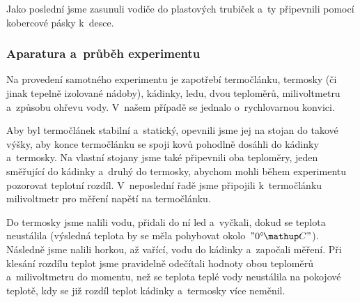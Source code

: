 Jako poslední jsme zasunuli vodiče do plastových trubiček a~ty připevnili
pomocí kobercové pásky k~desce.

\subsubsection{Aparatura a~průběh experimentu}
Na provedení samotného experimentu je zapotřebí termočlánku, termosky (či jinak
tepelně izolované nádoby), kádinky, ledu, dvou teploměrů, milivoltmetru
a~způsobu ohřevu vody. V~našem případě se jednalo o~rychlovarnou konvici.

Aby byl termočlánek stabilní a~statický, opevnili jsme jej na stojan do takové
výšky, aby konce termočlánku se spoji kovů pohodlně dosáhli do kádinky
a~termosky. Na vlastní stojany jsme také připevnili oba teploměry, jeden
směřující do kádinky a~druhý do termosky, abychom mohli během experimentu
pozorovat teplotní rozdíl. V~neposlední řadě jsme připojili k~termočlánku
milivoltmetr pro měření napětí na termočlánku. 

Do termosky jsme nalili vodu, přidali do ní led a~vyčkali, dokud se teplota
neustálila (výsledná teplota by se měla pohybovat okolo~$"0 \C"$). Následně jsme
nalili horkou, až vařící, vodu do kádinky a~započali měření. Při klesání
rozdílu teplot jsme pravidelně odečítali hodnoty obou teploměrů a~milivoltmetru
do momentu, než se teplota teplé vody neustálila na pokojové teplotě, kdy se
již rozdíl teplot kádinky a~termosky více neměnil.
